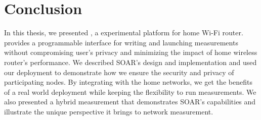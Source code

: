 \chapter{Conclusion}
\label{sec.conclusion}
In this thesis, we presented \sysname, a experimental platform for home Wi-Fi router. \sysname provides a programmable interface for writing and launching measurements without compromising user's privacy and minimizing the impact of home wireless router's performance. We described SOAR's design and implementation and used our deployment to demonstrate how we ensure the security and privacy of participating nodes. By integrating \sysname with the home networks, we get the benefits of a real world deployment while keeping the flexibility to run measurements. We also presented a hybrid measurement that demonstrates SOAR's capabilities and illustrate the unique perspective it brings to network measurement. 